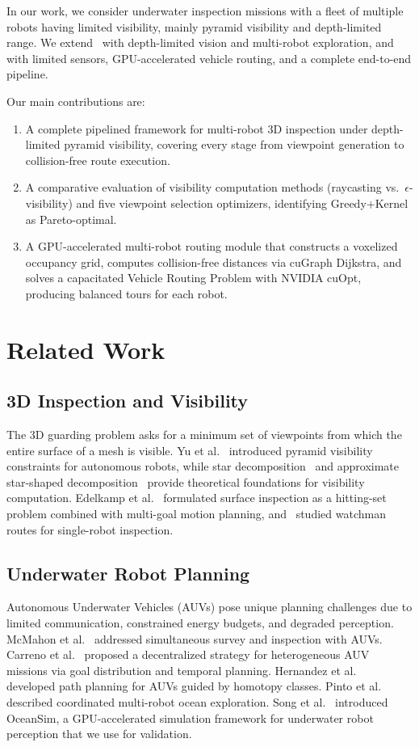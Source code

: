 \documentclass[letterpaper, 10 pt, conference]{ieeeconf}  %
\begin{document}
In our work, we consider underwater inspection missions with a fleet of multiple robots having limited visibility, mainly pyramid visibility and depth-limited range. We extend~\cite{pyramidvis} with depth-limited vision and multi-robot exploration, and~\cite{3dinspect} with limited sensors, GPU-accelerated vehicle routing, and a complete end-to-end pipeline.

Our main contributions are:
\begin{enumerate}
\item A complete pipelined framework for multi-robot 3D inspection under depth-limited pyramid visibility, covering every stage from viewpoint generation to collision-free route execution.
\item A comparative evaluation of visibility computation methods (raycasting vs.\ $\epsilon$-visibility) and five viewpoint selection optimizers, identifying Greedy+Kernel as Pareto-optimal.
\item A GPU-accelerated multi-robot routing module that constructs a voxelized occupancy grid, computes collision-free distances via cuGraph Dijkstra, and solves a capacitated Vehicle Routing Problem with NVIDIA cuOpt, producing balanced tours for each robot.
\end{enumerate}


\section{Related Work}

\subsection{3D Inspection and Visibility}
The 3D guarding problem asks for a minimum set of viewpoints from which the entire surface of a mesh is visible. Yu et al.~\cite{pyramidvis} introduced pyramid visibility constraints for autonomous robots, while star decomposition~\cite{Yu} and approximate star-shaped decomposition~\cite{PBG07_cr} provide theoretical foundations for visibility computation. Edelkamp et al.~\cite{3dinspect} formulated surface inspection as a hitting-set problem combined with multi-goal motion planning, and~\cite{watchman} studied watchman routes for single-robot inspection.

\subsection{Underwater Robot Planning}
Autonomous Underwater Vehicles (AUVs) pose unique planning challenges due to limited communication, constrained energy budgets, and degraded perception. McMahon et al.~\cite{inspectunderwater} addressed simultaneous survey and inspection with AUVs. Carreno et al.~\cite{Carreno_Pairet_Petillot_Petrick_2020} proposed a decentralized strategy for heterogeneous AUV missions via goal distribution and temporal planning. Hernandez et al.~\cite{Hernandez_Carreras_Ridao_2011} developed path planning for AUVs guided by homotopy classes. Pinto et al.~\cite{Pinto} described coordinated multi-robot ocean exploration. Song et al.~\cite{OceanSim} introduced OceanSim, a GPU-accelerated simulation framework for underwater robot perception that we use for validation.
\end{document}
